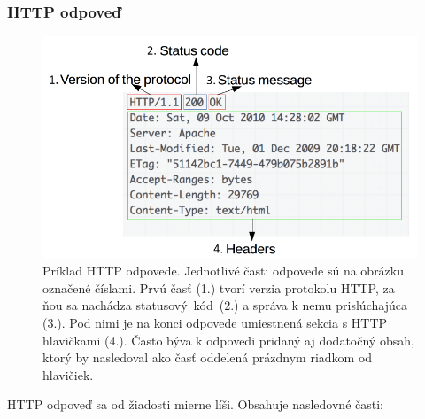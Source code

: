 \subsubsection{HTTP odpoveď}

\begin{figure}[htb]
\begin{center}
    \includegraphics[scale=0.6]{obrazky-figures/http_response.png}
    \caption{\centering Príklad HTTP odpovede. Jednotlivé časti odpovede sú na obrázku označené číslami. Prvú časť (1.) tvorí verzia protokolu HTTP, za ňou sa nachádza \mbox{statusový kód (2.)} a správa k nemu prislúchajúca (3.). Pod nimi je na konci odpovede umiestnená sekcia s HTTP hlavičkami (4.). Často býva k odpovedi pridaný aj dodatočný obsah, ktorý by nasledoval ako časť oddelená prázdnym riadkom od hlavičiek.}
    \label{fig:http-response}
\end{center}
\end{figure}

\noindent HTTP odpoveď sa od žiadosti mierne líši. Obsahuje nasledovné časti:

